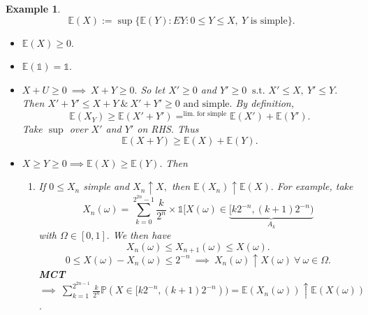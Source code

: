 \documentclass{article}
\newcommand{\1}{\mathds{1}}
\newcommand{\E}{\mathbb{E}}
\newcommand{\PB}{\mathbb{P}}
\newcommand{\f}[2]{\frac{#1}{#2}}
\newcommand{\st}{\text{ s.t. }}
\newtheorem{example}{Example}
\begin{document}
\begin{example}
    $$\E(X):=\sup\{\E(Y):EY:0\leq Y\leq X,\ Y\text{ is simple}\}.$$
    \begin{itemize}
        \item $\E(X)\geq 0.$
        \item $\E(\1)=\1.$
         \item $X+U\ge 0\ \implies\ X+Y\ge 0.$ So let $X'\geq 0$ and $Y'\ge 0\ \st X'\leq X,\ Y'\le Y.$ Then $X'+Y'\leq X+Y\ \&\ X'+Y'\ge 0\text{ and simple.}$ By definition, $$\E(X_Y)\geq \E(X'+Y')=^{\text{lim. for simple}}\E(X')+\E(Y').$$
    Take $\sup$ over $X'$ and $Y'$ on RHS. Thus $$\E(X+Y)\geq \E(X)+\E(Y).$$
    \item $X\ge Y\ge 0\implies \E(X)\geq \E(Y).$ Then 
    \begin{enumerate}
        \item[\textbf{MCT-1:}] If $0\leq X_n$ simple and $X_n\uparrow X,$ then $\E(X_n)\uparrow\E(X).$ For example, take $$X_n(\omega)=\sum_{k=0}^{2^{2n}-1}\f k{2^n}\times \1[X(\omega)\in \underbrace{[k2^{-n},(k+1)2^{-n})}_{A_k}$$ with $\Omega\in [0,1].$ We then have $$X_n(\omega)\leq X_{n+1}(\omega)\leq X(\omega).$$ $$0\leq X(\omega)-X_n(\omega)\leq 2^{-n}\ \implies\ X_n(\omega)\uparrow X(\omega)\ \forall\ \omega\in\Omega.$$ \textbf{MCT} $\implies\ \sum_{k=1}^{2^{2n-1}}\f k{2^n}\PB(X\in [k2^{-n},(k+1)2^{-n}))=\E(X_n(\omega))\uparrow \E(X(\omega))$. 
    \end{enumerate}
    \end{itemize}
\end{example}
\end{document}
